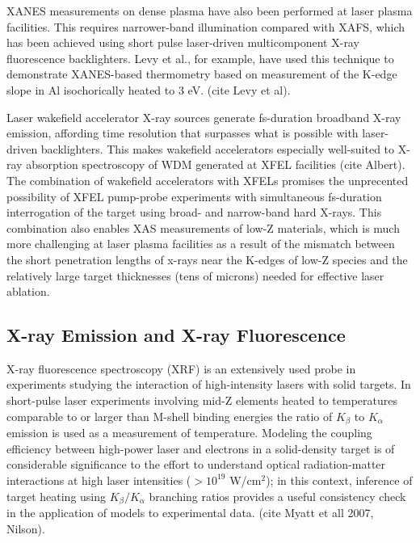 XANES measurements on dense plasma have also been performed at laser plasma facilities. This requires narrower-band illumination compared with XAFS, which has been achieved using short pulse laser-driven multicomponent X-ray fluorescence backlighters. Levy et al., for example, have used this technique to demonstrate XANES-based thermometry based on measurement of the K-edge slope in Al isochorically heated to 3 eV. (cite Levy et al).

Laser wakefield accelerator X-ray sources generate fs-duration broadband X-ray emission, affording time resolution that surpasses what is possible with laser-driven backlighters. This makes wakefield accelerators especially well-suited to X-ray absorption spectroscopy of WDM generated at XFEL facilities (cite Albert). The combination of wakefield accelerators with XFELs promises the unprecented possibility of XFEL pump-probe experiments with simultaneous fs-duration interrogation of the target using broad- and narrow-band hard X-rays. This combination also enables XAS measurements of low-Z materials, which is much more challenging at laser plasma facilities as a result of the mismatch between the short penetration lengths of x-rays near the K-edges of low-Z species and the relatively large target thicknesses (tens of microns) needed for effective laser ablation. 


\subsection{X-ray Emission and X-ray Fluorescence}
X-ray fluorescence spectroscopy (XRF) is an extensively used probe in experiments studying the interaction of high-intensity lasers with solid targets. In short-pulse laser experiments involving mid-Z elements heated to temperatures comparable to or larger than M-shell binding energies the ratio of $K_\beta$ to $K_\alpha$ emission is used as a measurement of temperature. Modeling the coupling efficiency between high-power laser and electrons in a solid-density target is of considerable significance to the effort to understand optical radiation-matter interactions at high laser intensities ($> 10^{19}$ W/cm$^2$); in this context, inference of target heating using $K_\beta/K_\alpha$ branching ratios provides a useful consistency check in the application of models to experimental data. (cite Myatt et all 2007, Nilson).

